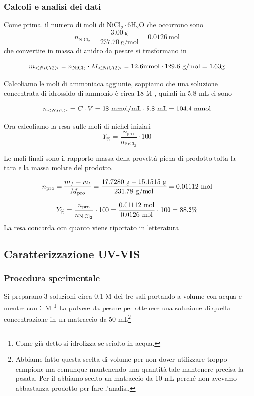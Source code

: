 \subsubsection{Calcoli e analisi dei dati}
Come prima, il numero di moli di $\mathrm{NiCl}_2 \cdot 6 \mathrm{H}_2 \mathrm{O}$ che occorrono sono
$$
n_{\mathrm{NiCl}_2}=\frac{3.00 \mathrm{~g}}{237.70 \mathrm{~g} / \mathrm{mol}}=0.0126 \mathrm{~mol}
$$
che convertite in massa di  anidro da pesare si trasformano in

\[  {m_{<NiCl2>}} = n_{\mathrm{NiCl}_2} \cdot {M_{<NiCl2>}} = 12.6 \text{mmol} \cdot 129.6  \ \text{g/mol} = 1.63 \text{g} \]

Calcoliamo le moli di ammoniaca aggiunte, sappiamo che una soluzione concentrata di idrossido di ammonio è circa $18$ M \cite{ammonia}, quindi in $5.8$ mL ci sono

\[ n_{<NH3>} = C \cdot V = 18\mathrm{\ mmol/mL} \cdot 5.8 \ \text{mL} = 104.4 \mathrm{\ mmol} \]

Ora calcoliamo la resa sulle moli di nichel iniziali
\[ Y_\% = \frac{n_\text{pro}}{n_{\mathrm{NiCl}_2}}\cdot 100 \]

Le moli finali sono il rapporto massa della provettà piena di prodotto tolta la tara e la massa molare del prodotto.

\[ n_\text{pro} = \frac{m_{f} - m_{t}}{M_\text{pro}} 
 = \frac{17.7280 \mathrm{\ g} - 15.1515\mathrm{\ g} }{ 231.78 \mathrm{\ g/mol}} = 0.01112 \mathrm{\ mol}\]

\[ Y_\% = \frac{n_\text{pro}}{n_{\mathrm{NiCl}_2}}\cdot 100  = \frac{0.01112 \mathrm{\ mol}}{0.0126 \mathrm{\ mol}} \cdot 100 = 88.2\% \]
La resa concorda con quanto viene riportato in letteratura \cite{support}
\subsection{Caratterizzazione UV-VIS}
\subsubsection{Procedura sperimentale}
Si preparano 3 soluzioni circa 0.1 M dei tre sali portando a volume con acqua  e 
mentre con  3 M \footnote{Come già detto  si  idrolizza se sciolto in acqua.}
La polvere da pesare per ottenere una soluzione di quella concentrazione in un matraccio da 50 mL\footnote{Abbiamo fatto questa scelta di volume per non dover utilizzare troppo campione ma comunque mantenendo una quantità tale mantenere precisa la pesata. Per il  abbiamo scelto un matraccio da 10 mL perché non avevamo abbastanza prodotto per fare l'analisi.}

